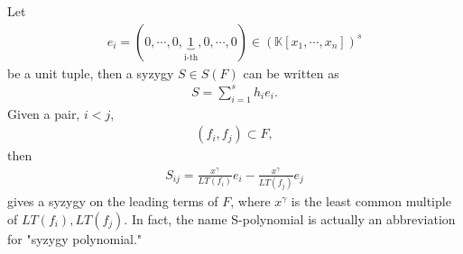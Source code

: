 \documentclass[11pt]{book}
\begin{document}
Let
\begin{eqnarray}
e_i = (0, \cdots, 0,\underbrace{1}_{\text{i-th}},0, \cdots, 0) \in (\mathbb{K}[x_1, \cdots, x_n])^s
\end{eqnarray}
be a unit tuple, then a syzygy $S \in S(F)$ can be written as
\begin{eqnarray}
S = \sum_{i=1}^s h_i e_i.
\end{eqnarray}
Given a pair, $i<j$,
\begin{eqnarray}
(f_i, f_j) \subset F,
\end{eqnarray}
then 
\begin{eqnarray}
S_{ij} =  \frac{x^\gamma}{LT(f_i)} e_i - \frac{x^\gamma}{LT(f_j)} e_j
\end{eqnarray}
gives a syzygy on the leading terms of $F$, where $x^\gamma$ is the least common multiple of $LT(f_i), LT(f_j)$.
In fact, the name S-polynomial is actually an abbreviation for "syzygy polynomial."
\end{document}
